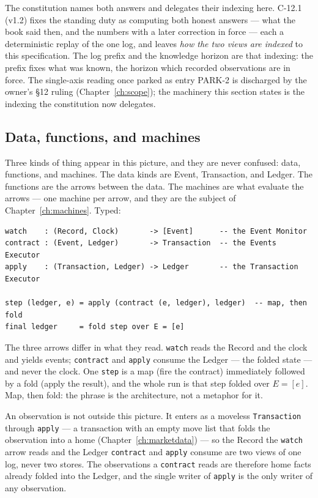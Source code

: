 The constitution names both answers and delegates their indexing here. C-12.1 (v1.2) fixes
the standing duty as computing both honest answers --- what the book said then, and the
numbers with a later correction in force --- each a deterministic replay of the one log, and
leaves \emph{how the two views are indexed} to this specification. The log prefix and the
knowledge horizon are that indexing: the prefix fixes what was known, the horizon which
recorded observations are in force. The single-axis reading once parked as entry PARK-2 is
discharged by the owner's \S 12 ruling (Chapter~\ref{ch:scope}); the machinery this section
states is the indexing the constitution now delegates.

\subsection{Data, functions, and machines}

Three kinds of thing appear in this picture, and they are never confused: data,
functions, and machines. The data kinds are Event, Transaction, and Ledger. The functions are
the arrows between the data. The machines are what evaluate the arrows --- one machine per
arrow, and they are the subject of Chapter~\ref{ch:machines}. Typed:

\begin{lstlisting}
watch    : (Record, Clock)       -> [Event]      -- the Event Monitor
contract : (Event, Ledger)       -> Transaction  -- the Events Executor
apply    : (Transaction, Ledger) -> Ledger       -- the Transaction Executor

step (ledger, e) = apply (contract (e, ledger), ledger)  -- map, then fold
final ledger     = fold step over E = [e]
\end{lstlisting}

The three arrows differ in what they read. \texttt{watch} reads the Record and the clock
and yields events; \texttt{contract} and \texttt{apply} consume the Ledger --- the folded
state --- and never the clock. One \texttt{step} is a map (fire the contract) immediately
followed by a fold (apply the result), and the whole run is that step folded over
$E=[e]$. Map, then fold: the phrase is the architecture, not a metaphor for it.

An observation is not outside this picture. It enters as a moveless
\texttt{Transaction} through \texttt{apply} --- a transaction with an empty move list
that folds the observation into a home (Chapter~\ref{ch:marketdata}) --- so the Record
the \texttt{watch} arrow reads and the Ledger \texttt{contract} and \texttt{apply}
consume are two views of one log, never two stores. The observations a \texttt{contract}
reads are therefore home facts already folded into the Ledger, and the single writer of
\texttt{apply} is the only writer of any observation.

